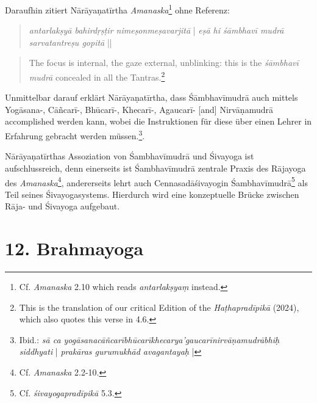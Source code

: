 Daraufhin zitiert Nārāyaṇatīrtha \textit{Amanaska}\footnote{Cf. \textit{Amanaska} 2.10 which reads \textit{antarlakṣyaṃ} instead.} ohne Referenz:
\begin{quote}
\textit{antarlakṣyā bahirdṛṣṭir nimeṣonmeṣavarjitā} |
\textit{eṣā hi śāmbhavī mudrā sarvatantreṣu gopitā} ||
\end{quote}
\begin{quote}
 The focus is internal, the gaze external, unblinking: this is the \emph{śāmbhavī mudrā} concealed in all the Tantras.\footnote{This is the translation of our critical Edition of the \textit{Haṭhapradīpikā} (2024), which also quotes this verse in 4.6.} 
  \end{quote}

Unmittelbar darauf erklärt Nārāyaṇatīrtha, dass Śāmbhavīmudrā auch mittels Yogāsana-, Cāñcarī-, Bhūcarī-, Khecarī-, Agaucarī- [and] Nirvāṇamudrā accomplished werden kann, wobei die Instruktionen für diese über einen Lehrer in Erfahrung gebracht werden müssen.\footnote{Ibid.: \textit{sā ca yogāsanacāñcarībhūcarīkhecarya'gaucarīnirvāṇamudrābhiḥ siddhyati} | \textit{prakāras gurumukhād avagantayaḥ} |}.    

Nārāyaṇatīrthas Assoziation von Śambhavīmudrā und Śivayoga ist aufschlussreich, denn einerseits ist Śambhavīmudrā zentrale Praxis des Rājayoga des \textit{Amanaska}\footnote{Cf. \textit{Amanaska} 2.2-10.}, andererseits lehrt auch Cennasadāśivayogin Śambhavīmudrā\footnote{Cf. \textit{śivayogapradīpikā} 5.3.} als Teil seines Śivayogasystems. Hierdurch wird eine konzeptuelle Brücke zwischen Rāja- und Śivayoga aufgebaut.  

\section{12. Brahmayoga}
\label{brahmayogaintro}

